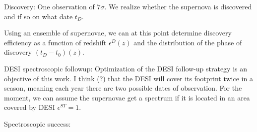\documentclass[onecolumn]{aastex61}   	%
\begin{document}
Discovery: One observation of $7\sigma$.  We realize whether the supernova is discovered and if so on what date $t_D$.

Using an ensemble of supernovae, we can at this point determine discovery efficiency as a function of redshift $\epsilon^D(z)$ and
the distribution of the phase of discovery $(t_D-t_0)(z)$.

DESI spectroscopic followup: Optimization of the DESI follow-up strategy is an objective of this work. 
 I think (?) that the DESI will cover its footprint
twice in a season, meaning each year there are two possible dates of observation.
For the moment, we can assume
the supernovae get a spectrum if it is located in an area covered by DESI $\epsilon^{ST}=1$. 

Spectroscopic success: 


%
%
%
%
%
%
%
%
%
\end{document}
